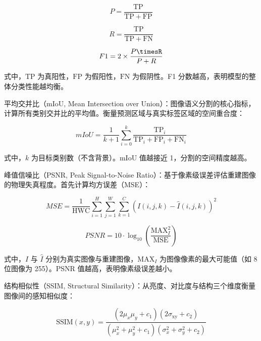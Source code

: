 \documentclass[preprint,12pt]{elsarticle}
\begin{document}
\begin{equation}
P=\frac{\mathrm{TP}}{\mathrm{TP}+\mathrm{FP}}
\end{equation}

\begin{equation}
R=\frac{\mathrm{TP}}{\mathrm{TP}+\mathrm{FN}}
\end{equation}

\begin{equation}
F1=2\times\frac{P\timesR}{P+R}
\end{equation}

式中，$\mathrm{TP}$ 为真阳性，$\mathrm{FP}$ 为假阳性，$\mathrm{FN}$ 为假阴性。F1 分数越高，表明模型的整体分类性能越均衡。

平均交并比（mIoU, Mean Intersection over Union）：图像语义分割的核心指标，计算所有类别交并比的平均值。衡量预测区域与真实标签区域的空间重合度：

\begin{equation}
mIoU=\frac{1}{k+1}\sum_{i=0}^{k} \frac{\mathrm{TP}_{i}}{\mathrm{TP}_{i}+\mathrm{FP}_{i}+\mathrm{FN}_{i}}
\end{equation}

式中，$k$ 为目标类别数（不含背景）。mIoU 值越接近 1，分割的空间精度越高。

峰值信噪比（PSNR, Peak Signal-to-Noise Ratio）：基于像素级误差评估重建图像的物理失真程度。首先计算均方误差（MSE）：

\begin{equation}
MSE=\frac{1}{\mathrm{HWC}}\sum_{i=1}^{H} \sum_{j=1}^{W} \sum_{k=1}^{C} {\left(I\left(i,j,k\right)-\hat{I}\left(i,j,k\right)\right)}^{2}
\end{equation}

\begin{equation}
PSNR=10\cdot\log_{10}\left(\frac{\mathrm{MAX}_{I}^{2}}{\mathrm{MSE}}\right)
\end{equation}

式中，$I$ 与 $\hat{I}$ 分别为真实图像与重建图像，$\mathrm{MAX}_{I}$ 为图像像素的最大可能值（如 8 位图像为 255）。PSNR 值越高，表明像素级误差越小。

结构相似性（SSIM, Structural Similarity）：从亮度、对比度与结构三个维度衡量图像间的感知相似度：

\begin{equation}
\mathrm{SSIM}\left(x,y\right)=\frac{\left(2{\mu}_{x}{\mu}_{y}+{c}_{1}\right)\left(2{\sigma}_{\mathrm{xy}}+{c}_{2}\right)}{\left({\mu}_{x}^{2}+{\mu}_{y}^{2}+{c}_{1}\right)\left({\sigma}_{x}^{2}+{\sigma}_{y}^{2}+{c}_{2}\right)}
\end{equation}
\end{document}
